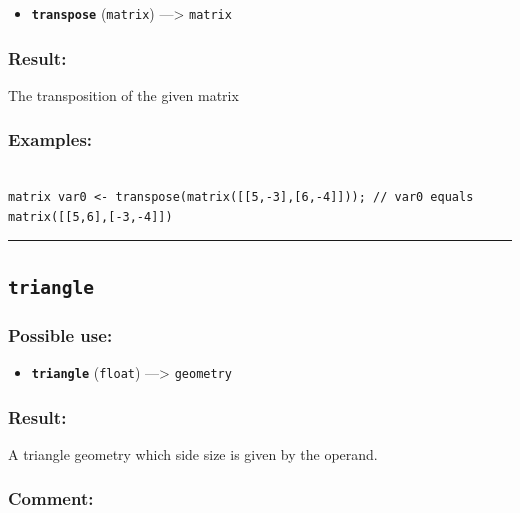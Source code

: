 \documentclass[]{book}
\providecommand{\tightlist}{%
  \setlength{\itemsep}{0pt}\setlength{\parskip}{0pt}}
\theoremstyle{definition}
\theoremstyle{definition}
\theoremstyle{definition}
\theoremstyle{remark}
\begin{document}
\begin{itemize}
\tightlist
\item
  \textbf{\texttt{transpose}} (\texttt{matrix}) ---\textgreater{}
  \texttt{matrix}
\end{itemize}

\subsubsection{Result:}\label{result-514}

The transposition of the given matrix

\subsubsection{Examples:}\label{examples-369}

\begin{verbatim}
 
matrix var0 <- transpose(matrix([[5,-3],[6,-4]])); // var0 equals matrix([[5,6],[-3,-4]])
\end{verbatim}

\begin{center}\rule{0.5\linewidth}{\linethickness}\end{center}

\subsection{\texorpdfstring{\texttt{triangle}}{triangle}}\label{triangle}

\subsubsection{Possible use:}\label{possible-use-533}

\begin{itemize}
\tightlist
\item
  \textbf{\texttt{triangle}} (\texttt{float}) ---\textgreater{}
  \texttt{geometry}
\end{itemize}

\subsubsection{Result:}\label{result-515}

A triangle geometry which side size is given by the operand.

\subsubsection{Comment:}\label{comment-101}
\end{document}
